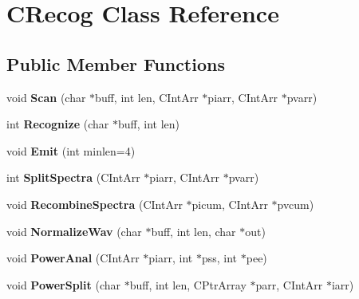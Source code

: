 \hypertarget{class_c_recog}{\section{C\-Recog Class Reference}
\label{class_c_recog}
}
\subsection*{Public Member Functions}
\begin{DoxyCompactItemize}
\item 
\hypertarget{class_c_recog_a4310d0cb5d220dbe1b5a81572be65efc}{void {\bfseries Scan} (char $\ast$buff, int len, C\-Int\-Arr $\ast$piarr, C\-Int\-Arr $\ast$pvarr)}\label{class_c_recog_a4310d0cb5d220dbe1b5a81572be65efc}

\item 
\hypertarget{class_c_recog_a3e1b4c9089ac7e3cc3547eea65b2d5d7}{int {\bfseries Recognize} (char $\ast$buff, int len)}\label{class_c_recog_a3e1b4c9089ac7e3cc3547eea65b2d5d7}

\item 
\hypertarget{class_c_recog_a91b1cfa3f1c3c88019a5f8eb4d31ce56}{void {\bfseries Emit} (int minlen=4)}\label{class_c_recog_a91b1cfa3f1c3c88019a5f8eb4d31ce56}

\item 
\hypertarget{class_c_recog_aeef3e7d112e7ca4fd07294718ab7eec3}{int {\bfseries Split\-Spectra} (C\-Int\-Arr $\ast$piarr, C\-Int\-Arr $\ast$pvarr)}\label{class_c_recog_aeef3e7d112e7ca4fd07294718ab7eec3}

\item 
\hypertarget{class_c_recog_a7810832ad1bdd270f9b7bf986b07dea3}{void {\bfseries Recombine\-Spectra} (C\-Int\-Arr $\ast$picum, C\-Int\-Arr $\ast$pvcum)}\label{class_c_recog_a7810832ad1bdd270f9b7bf986b07dea3}

\item 
\hypertarget{class_c_recog_ac3abb2b34774ff5ce735aa758ea6c4b0}{void {\bfseries Normalize\-Wav} (char $\ast$buff, int len, char $\ast$out)}\label{class_c_recog_ac3abb2b34774ff5ce735aa758ea6c4b0}

\item 
\hypertarget{class_c_recog_a5fbd031742559dec757350ed98d6da35}{void {\bfseries Power\-Anal} (C\-Int\-Arr $\ast$piarr, int $\ast$pss, int $\ast$pee)}\label{class_c_recog_a5fbd031742559dec757350ed98d6da35}

\item 
\hypertarget{class_c_recog_a33a3d11b4c6aa02917108167ba073e6f}{void {\bfseries Power\-Split} (char $\ast$buff, int len, C\-Ptr\-Array $\ast$parr, C\-Int\-Arr $\ast$iarr)}\label{class_c_recog_a33a3d11b4c6aa02917108167ba073e6f}


\end{DoxyCompactItemize}

